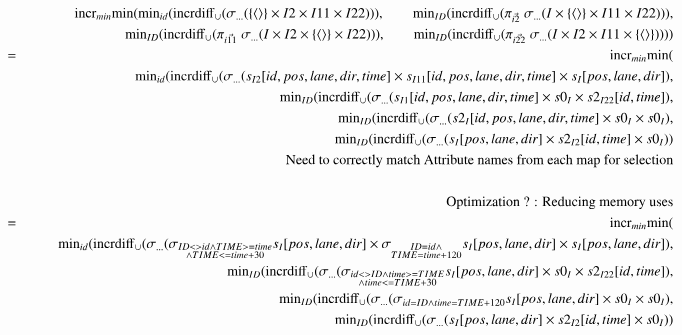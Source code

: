 \begin{eqnarray*}
&&\mathrm{incr}_{min} \mathrm{min} (\mathrm{min}_{id} (\mathrm{incrdiff}_{\cup} (\sigma_{\dots}(  \{{\langle\rangle} \} \times I2 \times I11 \times I22))) , 
\qquad\mathrm{min}_{ID}(\mathrm{incrdiff}_{\cup} (\pi_{\vec{i2}} \;\sigma_{\dots}(I \times \{{\langle\rangle} \} \times I11 \times I22))) ,
\\&&\qquad\mathrm{min}_{ID}(\mathrm{incrdiff}_{\cup} (\pi_{\vec{i11}} \;\sigma_{\dots}(I \times  I2 \times  \{{\langle\rangle} \} \times I22))) , 
\qquad\mathrm{min}_{ID}(\mathrm{incrdiff}_{\cup} (\pi_{\vec{i22}} \;\sigma_{ \dots}(I \times I2 \times I11 \times \{{\langle\rangle} \} ))))\\
&=& 
\mathrm{incr}_{min} \mathrm{min} (\\
&& \qquad \mathrm{min}_{id} (\mathrm{incrdiff}_{\cup} (\sigma_{\dots} (s_{I2}[id, pos, lane, dir, time] \times s_{I11}[id, pos, lane, dir, time] \times s_{I}[pos, lane, dir]),\\
&& \qquad \mathrm{min}_{ID} (\mathrm{incrdiff}_{\cup} (\sigma_{\dots} (s_{I1}[id, pos, lane, dir, time] \times s0_{I} \times s2_{I22} [id, time] ), \\
&& \qquad \mathrm{min}_{ID} (\mathrm{incrdiff}_{\cup} (\sigma_{\dots} (s2_{I} [id, pos, lane, dir, time] \times s0_{I} \times s0_{I}),\\
&& \qquad \mathrm{min}_{ID} (\mathrm{incrdiff}_{\cup} (\sigma_{\dots} (s_{I} [pos, lane, dir] \times s2_{I2}[id, time] \times s0_{I}))\\
&& \mbox{Need to correctly match Attribute names from each map for selection} \\
\\
&& \mbox{ Optimization ? : Reducing memory uses} \\
&=& 
\mathrm{incr}_{min} \mathrm{min} (\\
&& \qquad \mathrm{min}_{id} (\mathrm{incrdiff}_{\cup} (\sigma_{\dots} (\sigma_{\substack{ID<>id \wedge TIME >=time\\ \wedge TIME <=time +30}} s_{I}[pos, lane, dir] \times \sigma_{\substack{ID=id \wedge\\ TIME=time +120}} s_{I}[pos, lane, dir] \times s_{I}[pos, lane, dir]),\\
&& \qquad \mathrm{min}_{ID} (\mathrm{incrdiff}_{\cup} (\sigma_{\dots} (\sigma_{\substack{id<>ID \wedge time >=TIME \\ \wedge time <= TIME +30}} s_{I}[pos, lane, dir] \times s0_{I} \times s2_{I22} [id, time] ), \\
&& \qquad \mathrm{min}_{ID} (\mathrm{incrdiff}_{\cup} (\sigma_{\dots} (\sigma_{\substack{id = ID \wedge time = TIME +120}} s_{I} [ pos, lane, dir] \times s0_{I} \times s0_{I}),\\
&& \qquad \mathrm{min}_{ID} (\mathrm{incrdiff}_{\cup} (\sigma_{\dots} (s_{I} [pos, lane, dir] \times s2_{I2}[id, time] \times s0_{I}))\\
\end{eqnarray*}

